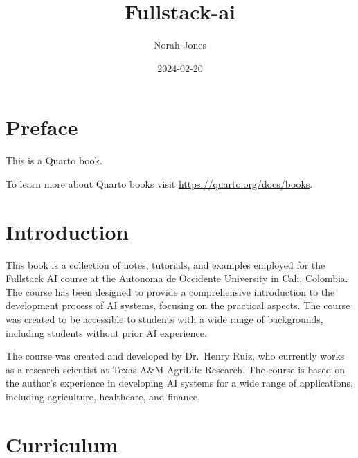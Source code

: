 \documentclass[
  letterpaper,
  DIV=11,
  numbers=noendperiod]{scrreprt}
\title{Fullstack-ai}
\author{Norah Jones}
\date{2024-02-20}
\renewcommand*\contentsname{Table of contents}
\newcommand\contentsname{Table of contents}
\begin{document}
\maketitle

\renewcommand*\contentsname{Table of contents}
{
\hypersetup{linkcolor=}
\setcounter{tocdepth}{2}
\tableofcontents
}

\chapter*{Preface}\label{preface}


This is a Quarto book.

To learn more about Quarto books visit
\url{https://quarto.org/docs/books}.


\chapter{Introduction}\label{introduction}

This book is a collection of notes, tutorials, and examples employed for
the Fullstack AI course at the Autonoma de Occidente University in Cali,
Colombia. The course has been designed to provide a comprehensive
introduction to the development process of AI systems, focusing on the
practical aspects. The course was created to be accessible to students
with a wide range of backgrounds, including students without prior AI
experience.

The course was created and developed by Dr.~Henry Ruiz, who currently
works as a research scientist at Texas A\&M AgriLife Research. The
course is based on the author's experience in developing AI systems for
a wide range of applications, including agriculture, healthcare, and
finance.


\chapter{Curriculum}\label{curriculum}
\end{document}
